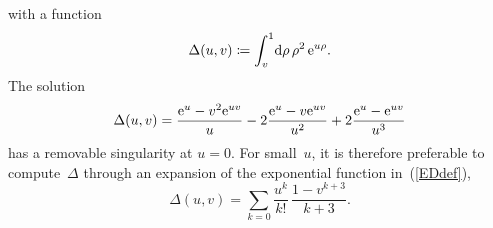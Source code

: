 with a function
\begin{equation}\label{EDdef}
  \Delta(u,v)
  \coloneqq \int_{v}^1\!\text{d}\rho\,\rho^2\,\text{e}^{u\rho}.
\end{equation}
The solution
\begin{equation}
  \Delta(u,v)
  = \frac{\text{e}^u-v^2\text{e}^{uv}}{u}
  - 2\frac{\text{e}^u-v\text{e}^{uv}}{u^2}
  + 2\frac{\text{e}^u-\text{e}^{uv}}{u^3}
\end{equation}
has a removable singularity at $u=0$.
For small~$u$, it is therefore preferable to compute~$\Delta$
through an expansion of the exponential function in~(\ref{EDdef}),
\begin{equation}
  \Delta(u,v)
  = \sum_{k=0} \frac{u^k}{k!}\,\frac{1-v^{k+3}}{k+3}.
\end{equation}

%
%
%
%

\iffalse
\section{Special functions near the removable singularity}

\index{Machine epsilon}
We assume a double-precision machine epsilon
of $\epsilon=2^{-52}\simeq2.2\cdot10^{-16}$.

\fi

